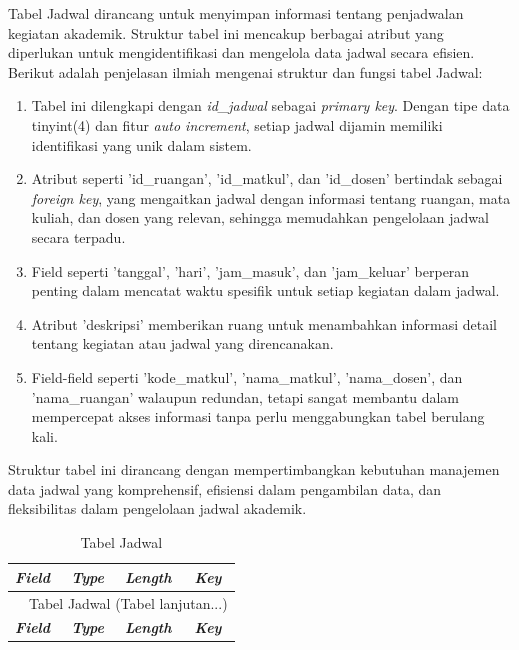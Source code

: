 \begin{enumerate}
	      Tabel Jadwal dirancang untuk menyimpan informasi tentang penjadwalan kegiatan akademik. Struktur tabel ini mencakup berbagai atribut yang diperlukan untuk mengidentifikasi dan mengelola data jadwal secara efisien. Berikut adalah penjelasan ilmiah mengenai struktur dan fungsi tabel Jadwal:

	      \begin{enumerate}[label=\alph*.]
		      \item Tabel ini dilengkapi dengan \textit{id\_jadwal} sebagai \textit{primary key}. Dengan tipe data tinyint(4) dan fitur \textit{auto increment}, setiap jadwal dijamin memiliki identifikasi yang unik dalam sistem.
		      \item Atribut seperti 'id\_ruangan', 'id\_matkul', dan 'id\_dosen' bertindak sebagai \textit{foreign key}, yang mengaitkan jadwal dengan informasi tentang ruangan, mata kuliah, dan dosen yang relevan, sehingga memudahkan pengelolaan jadwal secara terpadu.
		      \item Field seperti 'tanggal', 'hari', 'jam\_masuk', dan 'jam\_keluar' berperan penting dalam mencatat waktu spesifik untuk setiap kegiatan dalam jadwal.
		      \item Atribut 'deskripsi' memberikan ruang untuk menambahkan informasi detail tentang kegiatan atau jadwal yang direncanakan.
		      \item Field-field seperti 'kode\_matkul', 'nama\_matkul', 'nama\_dosen', dan 'nama\_ruangan' walaupun redundan, tetapi sangat membantu dalam mempercepat akses informasi tanpa perlu menggabungkan tabel berulang kali.
	      \end{enumerate}

	      Struktur tabel ini dirancang dengan mempertimbangkan kebutuhan manajemen data jadwal yang komprehensif, efisiensi dalam pengambilan data, dan fleksibilitas dalam pengelolaan jadwal akademik.

		      {
			      \fontsize{11}{13}\selectfont
			      \begin{longtable}{l l l l}
				      \caption{Tabel Jadwal}
				      \label{admin}                                                                                       \\
				      \hline
				      \textbf{\textit{Field}} & \textbf{\textit{Type}} & \textbf{\textit{Length}} & \textbf{\textit{Key}} \\
				      \hline
				      \endfirsthead

				      \multicolumn{4}{c}{\tablename\ \thetable\ {Tabel Jadwal} \space (Tabel lanjutan...)}                \\
				      \hline
				      \textbf{\textit{Field}} & \textbf{\textit{Type}} & \textbf{\textit{Length}} & \textbf{\textit{Key}} \\
				      \hline
				      \endhead


\end{longtable}}
\end{enumerate}
